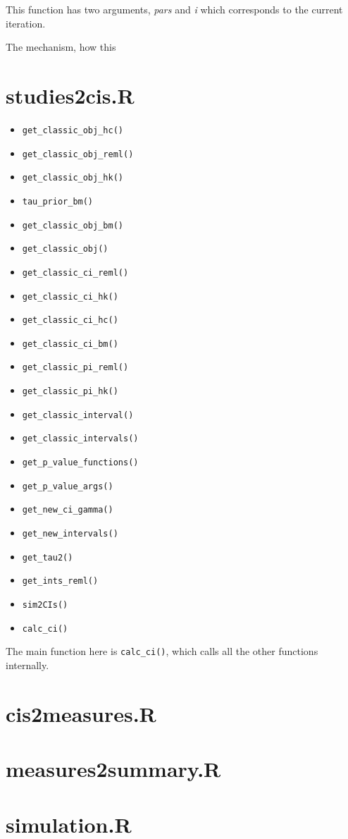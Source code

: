 \documentclass[letterpaper, 12pt]{article}\usepackage[]{graphicx}\usepackage[]{xcolor}
\begin{document}
This function has two arguments, \emph{pars} and \emph{i}
which corresponds to the current iteration.



The mechanism, how this 


\section{studies2cis.R}

\begin{itemize}
  \item \texttt{get\_classic\_obj\_hc()}
  \item \texttt{get\_classic\_obj\_reml()}
  \item \texttt{get\_classic\_obj\_hk()}
  \item \texttt{tau\_prior\_bm()}
  \item \texttt{get\_classic\_obj\_bm()}
  \item \texttt{get\_classic\_obj()}
  \item \texttt{get\_classic\_ci\_reml()}
  \item \texttt{get\_classic\_ci\_hk()}
  \item \texttt{get\_classic\_ci\_hc()}
  \item \texttt{get\_classic\_ci\_bm()}
  \item \texttt{get\_classic\_pi\_reml()}
  \item \texttt{get\_classic\_pi\_hk()}
  \item \texttt{get\_classic\_interval()}
  \item \texttt{get\_classic\_intervals()}
  \item \texttt{get\_p\_value\_functions()}
  \item \texttt{get\_p\_value\_args()}
  \item \texttt{get\_new\_ci\_gamma()}
  \item \texttt{get\_new\_intervals()}
  \item \texttt{get\_tau2()}
  \item \texttt{get\_ints\_reml()}
  \item \texttt{sim2CIs()}
  \item \texttt{calc\_ci()}
\end{itemize}

The main function here is \texttt{calc\_ci()}, which calls all the other
functions internally.


\section{cis2measures.R}
\section{measures2summary.R}
\section{simulation.R}

%
%
\end{document}
